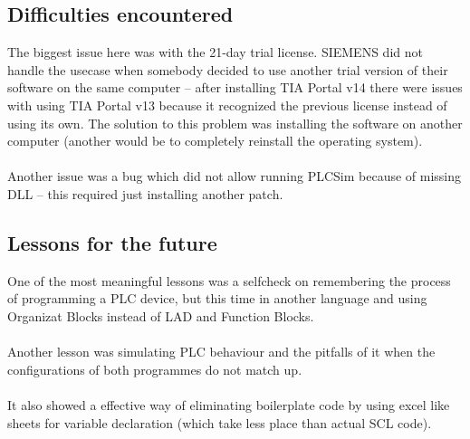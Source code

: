 \documentclass[a4paper, 12pt, titlepage]{article}
\begin{document}
        \subsection{Difficulties encountered}
            The biggest issue here was with the 21-day trial license. SIEMENS did 
            not handle the usecase when somebody decided to use another trial
            version of their software on the same computer -- after installing TIA
            Portal v14 there were issues with using TIA Portal v13 because it
            recognized the previous license instead of using its own. The solution
            to this problem was installing the software on another computer
            (another would be to completely reinstall the operating system).
            \\ \\
            Another issue was a bug which did not allow running PLCSim because of
            missing DLL -- this required just installing another patch.
        \subsection{Lessons for the future}
            One of the most meaningful lessons was a selfcheck on remembering the 
            process of programming a PLC device, but this time in another language
            and using Organizat Blocks instead of LAD and Function Blocks. 
            \\ \\
            Another lesson was simulating PLC behaviour and the pitfalls of it
            when the configurations of both programmes do not match up.
            \\ \\
            It also showed a effective way of eliminating boilerplate code by using
            excel like sheets for variable declaration (which take less place than
            actual SCL code).
\end{document}
